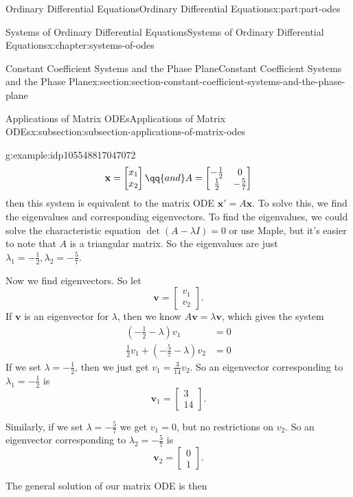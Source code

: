 \documentclass[twoside,10pt,]{book}
\numberwithin{equation}{part}
\renewcommand{\vec}[1]{\mathbf{#1}}
\newcommand{\amp}{&}
\begin{document}
\begin{partptx}{Ordinary Differential Equations}{}{Ordinary Differential Equations}{}{}{x:part:part-odes}
\begin{chapterptx}{Systems of Ordinary Differential Equations}{}{Systems of Ordinary Differential Equations}{}{}{x:chapter:systems-of-odes}
\begin{sectionptx}{Constant Coefficient Systems and the Phase Plane}{}{Constant Coefficient Systems and the Phase Plane}{}{}{x:section:section-constant-coefficient-systems-and-the-phase-plane}
\begin{subsectionptx}{Applications of Matrix ODEs}{}{Applications of Matrix ODEs}{}{}{x:subsection:subsection-applications-of-matrix-odes}
\begin{example}{}{g:example:idp105548817047072}
\begin{equation*}
\vec{x} = \begin{bmatrix} x_{1} \\ x_{2} \end{bmatrix} \qq{and} A = \begin{bmatrix}-\frac{1}{2} \amp  0 \\ \frac{1}{2} \amp  -\frac{5}{7}\end{bmatrix}
\end{equation*}
then this system is equivalent to the matrix ODE \(\vec{x}' = A\vec{x}\). To solve this, we find the eigenvalues and corresponding eigenvectors. To find the eigenvalues, we could solve the characteristic equation \(\det(A-\lambda I) = 0\) or use Maple, but it's easier to note that \(A\) is a triangular matrix. So the eigenvalues are just \(\lambda_{1} = -\frac{1}{2},\lambda_{2} = -\frac{5}{7}\).%
\par
Now we find eigenvectors. So let%
\begin{equation*}
\vec{v} = \begin{bmatrix}v_{1} \\ v_{2}\end{bmatrix}.
\end{equation*}
If \(\vec{v}\) is an eigenvector for \(\lambda\), then we know \(A\vec{v} = \lambda\vec{v}\), which gives the system%
\begin{align*}
(-\frac{1}{2}-\lambda)v_{1} \amp = 0\\
\frac{1}{2}v_{1} + (-\frac{5}{7}-\lambda)v_{2} \amp = 0
\end{align*}
If we set \(\lambda=-\frac{1}{2}\), then we just get \(v_{1} = \frac{3}{14}v_{2}\). So an eigenvector corresponding to \(\lambda_{1} = -\frac{1}{2}\) is%
\begin{equation*}
\vec{v}_{1} = \begin{bmatrix}3\\14\end{bmatrix}.
\end{equation*}
%
\par
Similarly, if we set \(\lambda=-\frac{5}{7}\) we get \(v_{1} = 0\), but no restrictions on \(v_{2}\). So an eigenvector corresponding to \(\lambda_{2} = -\frac{5}{7}\) is%
\begin{equation*}
\vec{v}_{2} = \begin{bmatrix}0\\1\end{bmatrix}.
\end{equation*}
%
\par
The general solution of our matrix ODE is then%

\end{example}
\end{subsectionptx}
\end{sectionptx}
\end{chapterptx}
\end{partptx}
\end{document}
